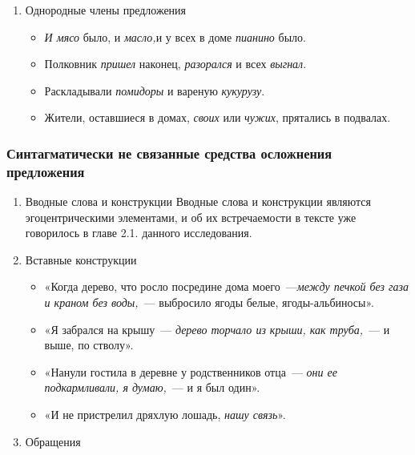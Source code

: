\documentclass{kursa4}
\begin{document}
{{\begin{enumerate}
            \item Однородные члены предложения
            \begin{itemize}
              \item \textit{И мясо} было, и \textit{масло,}и у всех в доме \textit{пианино} было. 
              \item Полковник \textit{пришел} наконец, \textit{разорался} и всех \textit{выгнал}.
              \item Раскладывали \textit{помидоры} и вареную \textit{кукурузу}.
              \item Жители, оставшиеся в домах, \textit{своих} или \textit{чужих}, прятались в подвалах.
            \end{itemize}
          \end{enumerate}

      \subsubsection{Синтагматически не связанные средства осложнения предложения}

        \begin{enumerate}
          \item Вводные слова и конструкции \newline
          Вводные слова и конструкции являются
          эгоцентрическими элементами, и об их встречаемости в тексте уже
          говорилось в главе 2.1. данного исследования. 

          \item Вставные конструкции

          \begin{itemize}
            \item «Когда дерево, что росло посредине дома моего~---\textit{между печкой без газа и краном без воды,}~--- выбросило ягоды белые, ягоды-альбиносы».
            \item «Я забрался на крышу~--- \textit{дерево торчало из крыши, как труба,}~--- и выше, по стволу».
            \item «Нанули гостила в деревне у родственников отца~--- \textit{они ее подкармливали, я думаю,}~--- и я был один».
            \item «И не пристрелил дряхлую лошадь, \textit{нашу связь}».
          \end{itemize}

          \item Обращения


\end{enumerate}}}
\end{document}
